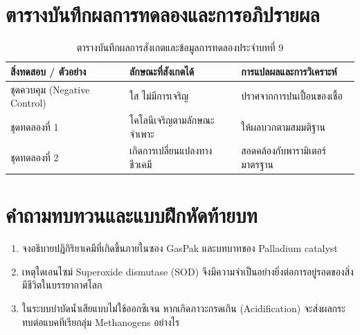\section{ตารางบันทึกผลการทดลองและการอภิปรายผล}
\begin{table}[H]
\centering\small
\caption{ตารางบันทึกผลการสังเกตและข้อมูลการทดลองประจำบทที่ 9}
\label{tab:ch09_datasheet}
\begin{tabularx}{\textwidth}{p{} p{} X}
\toprule
\textbf{สิ่งทดสอบ / ตัวอย่าง} & \textbf{ลักษณะที่สังเกตได้} & \textbf{การแปลผลและการวิเคราะห์} \\
\midrule
ชุดควบคุม (Negative Control) & ใส ไม่มีการเจริญ & ปราศจากการปนเปื้อนของเชื้อ \\
ชุดทดลองที่ 1 & โคโลนีเจริญตามลักษณะจำเพาะ & ให้ผลบวกตามสมมติฐาน \\
ชุดทดลองที่ 2 & เกิดการเปลี่ยนแปลงทางชีวเคมี & สอดคล้องกับพารามิเตอร์มาตรฐาน \\
\bottomrule
\end{tabularx}
\end{table}

\section{คำถามทบทวนและแบบฝึกหัดท้ายบท}
\begin{enumerate}
    \item จงอธิบายปฏิกิริยาเคมีที่เกิดขึ้นภายในซอง GasPak และบทบาทของ Palladium catalyst
    \item เหตุใดเอนไซม์ Superoxide dismutase (SOD) จึงมีความจำเป็นอย่างยิ่งต่อการอยู่รอดของสิ่งมีชีวิตในบรรยากาศโลก
    \item ในระบบบำบัดน้ำเสียแบบไม่ใช้ออกซิเจน หากเกิดภาวะกรดเกิน (Acidification) จะส่งผลกระทบต่อแบคทีเรียกลุ่ม Methanogens อย่างไร
\end{enumerate}
